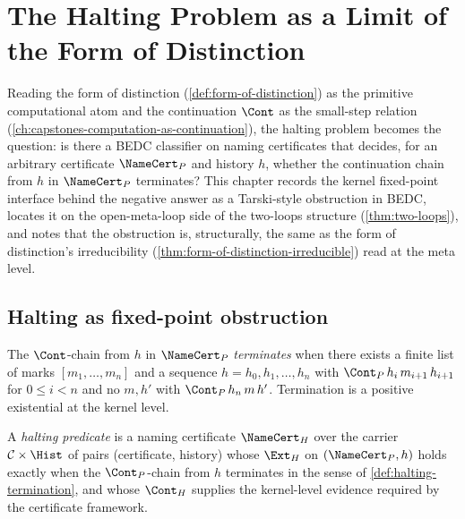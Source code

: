 \chapter{The Halting Problem as a Limit of the Form of Distinction}
\label{ch:capstones-halting-as-form-of-distinction-limit}

Reading the form of distinction (\autoref{def:form-of-distinction}) as the primitive computational atom and the continuation $\Cont$ as the small-step relation (\autoref{ch:capstones-computation-as-continuation}), the halting problem becomes the question: is there a BEDC classifier on naming certificates that decides, for an arbitrary certificate $\NameCert_{P}$ and history $h$, whether the continuation chain from $h$ in $\NameCert_{P}$ terminates? This chapter records the kernel fixed-point interface behind the negative answer as a Tarski-style obstruction in BEDC, locates it on the open-meta-loop side of the two-loops structure (\autoref{thm:two-loops}), and notes that the obstruction is, structurally, the same as the form of distinction's irreducibility (\autoref{thm:form-of-distinction-irreducible}) read at the meta level.

\section{Halting as fixed-point obstruction}
\label{sec:halting-as-form-of-distinction-fixed-point}

\begin{definition}
\label{def:halting-termination}
The $\Cont$-chain from $h$ in $\NameCert_{P}$ \emph{terminates} when there exists a finite list of marks $[m_1, \ldots, m_n]$ and a sequence $h = h_0, h_1, \ldots, h_n$ with $\Cont_P\,h_i\,m_{i+1}\,h_{i+1}$ for $0 \le i < n$ and no $m, h'$ with $\Cont_P\,h_n\,m\,h'$. Termination is a positive existential at the kernel level.
\end{definition}

\begin{definition}
\label{def:halting-predicate}
A \emph{halting predicate} is a naming certificate $\NameCert_H$ over the carrier $\mathcal{C} \times \Hist$ of pairs (certificate, history) whose $\Ext_H$ on $(\NameCert_P, h)$ holds exactly when the $\Cont_P$-chain from $h$ terminates in the sense of \autoref{def:halting-termination}, and whose $\Cont_H$ supplies the kernel-level evidence required by the certificate framework.
\end{definition}

